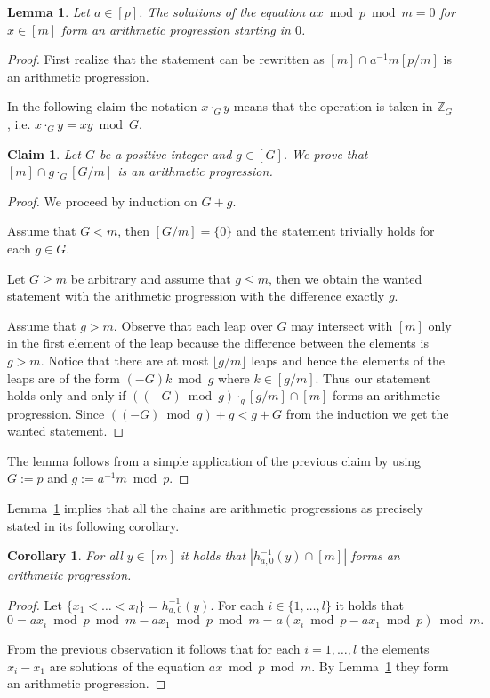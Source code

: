 \documentclass{article}
\newtheorem{lemma}{Lemma}
\newtheorem{claim}{Claim}
\newtheorem{corollary}{Corollary}
\begin{document}
\begin{lemma}
\label{lemma-equation}
Let $a \in [p]$. The solutions of the equation $ax \bmod p \bmod m = 0$ for $x \in [m]$ form an arithmetic progression starting in $0$.
\end{lemma}
\begin{proof}
First realize that the statement can be rewritten as $[m] \cap a^{-1}m [p/m]$ is an arithmetic progression.

In the following claim the notation $x \cdot_G y$ means that the operation is taken in $\mathbb{Z}_{G}$, i.e. $x \cdot_G y = xy \bmod G$. 
\begin{claim}
\label{claim:arithmetic-progression}
Let $G$ be a positive integer and $g \in [G]$. We prove that $[m] \cap g \cdot_{G} [G/m]$ is an arithmetic progression.
\end{claim}
\begin{proof}
We proceed by induction on $G + g$.

Assume that $G < m$, then $[G/m] = \{0\}$ and the statement trivially holds for each $g \in G$.

Let $G \geq m$ be arbitrary and assume that $g \leq m$, then we obtain the wanted statement with the arithmetic progression with the difference exactly $g$.

Assume that $g > m$.
Observe that each leap over $G$ may intersect with $[m]$ only in the first element of the leap because the difference between the elements is $g > m$.
Notice that there are at most $\lfloor g/m \rfloor$ leaps and hence the elements of the leaps are of the form $(-G)k \bmod g$ where $k \in [g/m]$.
Thus our statement holds only and only if $((-G) \bmod g) \cdot_g [g/m] \cap [m]$ forms an arithmetic progression. Since $((-G) \bmod g) + g < g + G$ from the induction we get the wanted statement.
\end{proof}
The lemma follows from a simple application of the previous claim by using $G := p$ and $g := a^{-1}m \bmod p$.
\end{proof}

Lemma~\ref{lemma-equation} implies that all the chains are arithmetic progressions as precisely stated in its following corollary.
\begin{corollary}
For all $y \in [m]$ it holds that $|h_{a, 0}^{-1}(y) \cap [m]|$ forms an arithmetic progression.
\end{corollary}
\begin{proof}
Let $\{x_1 < \dots < x_l\} = h_{a, 0}^{-1}(y)$.
For each $i \in \{1, \dots, l\}$ it holds that \[0 = a x_i \bmod p \bmod m - a x_1 \bmod p \bmod m = a (x_i \bmod p - a x_1 \bmod p) \bmod m.\]

From the previous observation it follows that for each $i = 1, \dots, l$ the elements $x_i - x_1$ are solutions of the equation $ax \bmod p \bmod m$.
By Lemma~\ref{lemma-equation} they form an arithmetic progression.
\end{proof}
\end{document}
